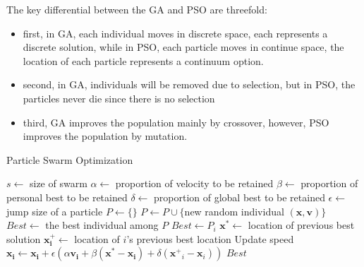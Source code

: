                 The key differential between the GA and PSO are threefold: 
                \begin{itemize}
                    \item first, in GA, each individual moves in discrete space, each represents a discrete solution, while in PSO, each particle moves in continue space, the location of each particle represents a continuum option.
                    \item second, in GA, individuals will be removed due to selection, but in PSO, the particles never die since there is no selection
                    \item third, GA improves the population mainly by crossover, however, PSO improves the population by mutation.
                \end{itemize} 

                \begin{algorithm}[!htp]
                    \centering
                    \caption{Particle Swarm Optimization}
                    \begin{algorithmic}[1]
                        \State $s \gets$ size of swarm
                        \State $\alpha \gets$ proportion of velocity to be retained
                        \State $\beta \gets$ proportion of personal best to be retained
                        \State $\delta \gets$ proportion of global best to be retained
                        \State $\epsilon \gets$ jump size of a particle
                        \State $P \gets \{\}$
                            \State $P \gets P \cup \{$new random individual $(\mathbf{x}, \mathbf{v})\}$
                        \EndWhile
                        \State $Best \gets$ the best individual among $P$
                                    \State $Best \gets P_i$
                                \EndIf
                            \EndFor
                                \State $\mathbf{x^*} \gets$ location of previous best solution
                                \State $\mathbf{x^+_i} \gets$ location of $i$'s previous best location
                                \State Update speed $\mathbf{x_i} \gets \mathbf{x_i} + \epsilon (\alpha\mathbf{v_i} + \beta(\mathbf{x}^* - \mathbf{x_i}) + \delta(\mathbf{x^+}_i - \mathbf{x}_i))$
                            \EndFor
                        \EndWhile
                        \State \Return $Best$
                    \end{algorithmic}
                \end{algorithm}

